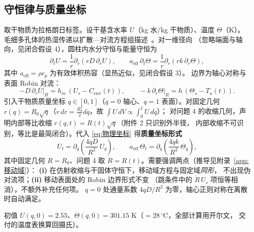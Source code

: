 \documentclass[12pt,a4paper]{ctexart}
\numberwithin{equation}{section}
\begin{document}
\subsection{守恒律与质量坐标}
取干物质为拉格朗日标签。设干基含水率 $U$（kg 水/kg 干物质）、温度 $\varTheta$（K）。
毛细多孔体的热湿传递以扩散—对流方程组描述~\cite{luikov}。对一维径向
（忽略端面与轴向，见闭合假设 4），圆柱内水分守恒与能量守恒为
\begin{equation}
\partial_t U = \frac{1}{r}\partial_r\!\left(rD\,\partial_r U\right),\qquad
a_{\mathrm{eff}}\,\partial_t\varTheta
 = \frac{1}{r}\partial_r\!\left(rk\,\partial_r\varTheta\right),
\label{eq:物理坐标}
\end{equation}
其中 $a_{\mathrm{eff}}=\rho c_p$ 为有效体积热容（显热近似，见闭合假设 3）。
边界为轴心对称与表面 Robin 对流：
\begin{equation}
-D\,\partial_r U\big|_{R}=h_m\,(U_s-C_{\mathrm{env}}(t)),\qquad
-k\,\partial_r\varTheta\big|_{R}=h\,(\varTheta_s-T_a(t)).
\label{eq:边界}
\end{equation}
引入干物质质量坐标 $q\in[0,1]$（$q=0$ 轴心、$q=1$ 表面）。对固定几何
$r(q)=R_0\sqrt{q}$（$r\,dr=\tfrac{R_0^2}{2}dq$，故 $\int U\,dV\propto\int_0^1U\,dq$）；
对问题 4 的收缩几何，声明内部等比收缩 $r(q,t)=R(t)\sqrt{q}$（附件 2 只识别外半径，
内部收缩不可识别，等比是最简闭合）。代入 \eqref{eq:物理坐标} 得\textbf{质量坐标形式}
\begin{equation}
U_t=\partial_q\!\left(\frac{4qD}{R^2}\,U_q\right),\qquad
a_{\mathrm{eff}}\,\varTheta_t
 =\partial_q\!\left(\frac{4qk}{R^2}\,\varTheta_q\right),
\label{eq:质量坐标}
\end{equation}
其中固定几何 $R=R_0$、问题 4 取 $R=R(t)$。需要强调两点（推导见附录~\ref{app:移动域}）：
\textbf{(i)} 在仿射收缩与干固体守恒下，移动域方程与固定域\emph{同形}，
不出现伪对流项；\textbf{(ii)} 移动表面处的 Robin 边界形式不变
（跳条件中的 $\dot R\,U_s$ 项恒等相消），不额外补充任何项。
$q=0$ 处通量系数 $4qD/R^2$ 为零，轴心正则对称在离散时自动满足。

初值 $U(q,0)=2.55$、$\varTheta(q,0)=301.15$ K（$=28\,^{\circ}$C，全部计算用开尔文，
交付的温度表换算回摄氏）。
\end{document}
